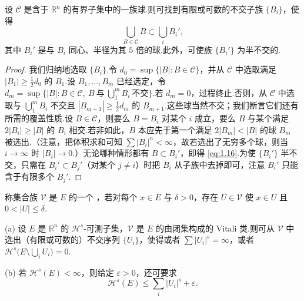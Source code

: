 \begin{lemma}\label{lem:1.9}
设 $\mathcal{C}$ 是含于 $\mathbb{R}^n$ 的有界子集中的一族球.则可找到有限或可数的不交子族 $\{B_i\}$，使得
\begin{equation}\label{eq:1.16}
  \bigcup_{B\in\mathcal{C}}B\subset\bigcup_{i}B_i',
\end{equation}
其中 $B_i'$ 是与 $B_i$ 同心、半径为其 $5$ 倍的球.此外，可使族 $\{B_i'\}$ 为半不交的.
\end{lemma}

\begin{proof}
我们归纳地选取 $\{B_i\}$.令 $d_0=\sup\{|B|:B\in\mathcal{C}\}$，并从 $\mathcal{C}$ 中选取满足 $|B_1|\geq\frac{1}{2}d_0$ 的 $B_1$.设 $B_1,\ldots,B_m$ 已经选定，令 $d_m=\sup\{|B|:B\in\mathcal{C},\ B\ \text{与}\ \bigcup_{1}^{m}B_i\ \text{不交}\}$.若 $d_m=0$，过程终止.否则，从 $\mathcal{C}$ 中选取与 $\bigcup_{1}^{m}B_i$ 不交且 $|B_{m+1}|\geq\frac{1}{2}d_m$ 的 $B_{m+1}$.这些球当然不交；我们断言它们还有所需的覆盖性质.设 $B\in\mathcal{C}$，则要么 $B=B_i$ 对某个 $i$ 成立，要么 $B$ 与某个满足 $2|B_i|\geq|B|$ 的 $B_i$ 相交.若非如此，$B$ 本应先于第一个满足 $2|B_m|<|B|$ 的球 $B_m$ 被选出.（注意，把体积求和可知 $\sum|B_i|^n<\infty$，故若选出了无穷多个球，则当 $i\to\infty$ 时 $|B_i|\to 0$.）无论哪种情形都有 $B\subset B_i'$，即得 \eqref{eq:1.16}.为使 $\{B_i'\}$ 半不交，只需在 $B_i'\subset B_j'$（对某个 $j\neq i$）时把 $B_i$ 从子族中去掉即可，注意 $B_i'$ 只能含于有限多个 $B_j'$.
\end{proof}

称集合族 $\mathcal{V}$ 是 $E$ 的一个 ，若对每个 $x\in E$ 与 $\delta>0$，存在 $U\in\mathcal{V}$ 使 $x\in U$ 且 $0<|U|\leq\delta$.


\begin{theorem}\label{thm:1.10}
(a) 设 $E$ 是 $\mathbb{R}^n$ 的 $\mathcal{H}^s$-可测子集，$\mathcal{V}$ 是 $E$ 的由闭集构成的 Vitali 类.则可从 $\mathcal{V}$ 中选出（有限或可数的）不交序列 $\{U_i\}$，使得或者 $\sum|U_i|^s=\infty$，或者 $\mathcal{H}^s\bigl(E\setminus\bigcup_{i}U_i\bigr)=0$.

(b) 若 $\mathcal{H}^s(E)<\infty$，则给定 $\varepsilon>0$，还可要求
\[
  \mathcal{H}^{s}(E)\leq\sum_{i}|U_i|^{s}+\varepsilon.
\]
\end{theorem}

